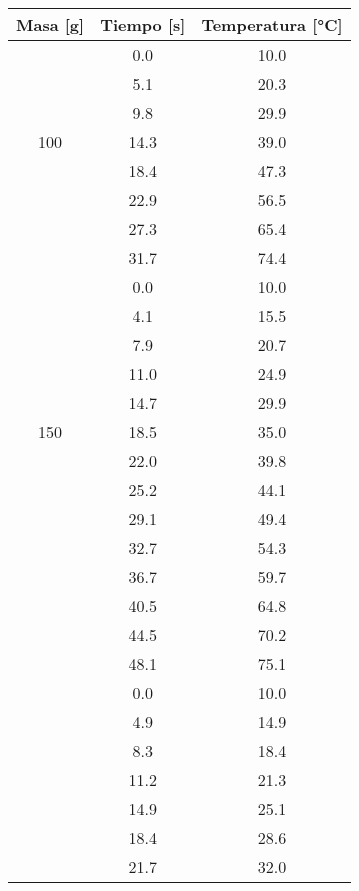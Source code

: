 \documentclass[a4paper, 12p]{article}
\begin{document}
\begin{table}[H]
      \centering
      \begin{tabular}{|c|c|c|}\hline
           Masa [g]& Tiempo [s] & Temperatura [°C]\\ \hline
                   &   0.0      &  10.0\\
                   &   5.1      &  20.3\\
                   &   9.8      &  29.9\\
          100      &   14.3     &  39.0\\
                   &   18.4     &  47.3\\
                   &  22.9      &  56.5 \\
                   &  27.3      &  65.4\\
                   &  31.7      &  74.4\\ \hline
                   & 0.0        &  10.0\\
                   &4.1         &  15.5\\
                   &7.9         &  20.7\\
                   &11.0        &  24.9\\
                   &14.7        &  29.9\\ 
          150      &18.5        &  35.0\\
                   &22.0        &  39.8\\
                   &25.2        &  44.1\\
                   &29.1        &  49.4\\
                   &32.7        &  54.3\\
                   &36.7        &  59.7\\
                   &40.5        &  64.8\\
                   &44.5        &  70.2\\
                   &48.1        &  75.1\\ \hline 
                  &    0.0       &10.0\\
                  &   4.9        &14.9\\
                  &    8.3       &18.4\\
                  &    11.2      &21.3\\
                  &    14.9      &25.1\\
                  &    18.4      &28.6\\
                  &    21.7      &32.0\\

\end{tabular}
\end{table}
\end{document}
